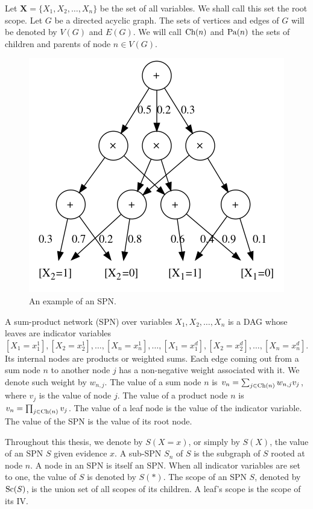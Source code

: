 Let $\mathbf{X}=\{X_1,X_2,\ldots,X_n\}$ be the set of all variables. We shall call this set the
root scope. Let $G$ be a directed acyclic graph. The sets of vertices and edges of $G$ will be
denoted by $V(G)$ and $E(G)$. We will call $\operatorname*{\text{Ch}}(n)$ and $\operatorname*{\text{Pa}}(n)$ the sets of children and parents
of node $n\in V(G)$.

\begin{figure}[h]
  \centering\includegraphics[scale=0.6]{graphs/sample_spn.png}
  \caption{An example of an SPN.\label{fig:sample_spn}}
\end{figure}

\begin{definition}
  A sum-product network (SPN) over variables $X_1,X_2,\ldots,X_n$ is a DAG whose leaves are
  indicator variables $[X_1=x_1^1],[X_2=x_2^1],\ldots,[X_n=x_n^1],\ldots,[X_1=x_1^d],[X_2=x_2^d],
  \ldots,[X_n=x_n^d]$. Its internal nodes are products or weighted sums. Each edge coming out from
  a sum node $n$ to another node $j$ has a non-negative weight associated with it. We denote such
  weight by $w_{n,j}$. The value of a sum node $n$ is $v_n=\sum_{j\in\operatorname*{\text{Ch}}(n)}w_{n,j}v_j$, where
  $v_j$ is the value of node $j$. The value of a product node $n$ is $v_n=\prod_{j\in\operatorname*{\text{Ch}}(n)}v_j$.
  The value of a leaf node is the value of the indicator variable. The value of the SPN is the
  value of its root node.
\end{definition}

Throughout this thesis, we denote by $S(X=x)$, or simply by $S(X)$, the value of an SPN $S$ given
evidence $x$. A sub-SPN $S_n$ of $S$ is the subgraph of $S$ rooted at node $n$. A node in an SPN is
itself an SPN\@. When all indicator variables are set to one, the value of $S$ is denoted by
$S(\ast)$. The scope of an SPN $S$, denoted by $\operatorname*{\text{Sc}}(S)$, is the union set of all scopes of its
children. A leaf's scope is the scope of its IV\@.

